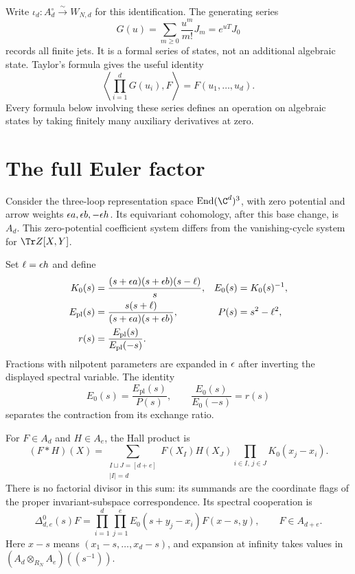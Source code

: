 Write $\iota_d:A_d^\circ\xrightarrow{\sim}W_{N,d}$ for this
identification. The generating series
\begin{equation}\label{cyjets:eq:generating-state}
 G(u)=\sum_{m\geq0}\frac{u^m}{m!}J_m=e^{uT}J_0
\end{equation}
records all finite jets. It is a formal series of states, not an
additional algebraic state. Taylor's formula gives the useful identity
\begin{equation}\label{cyjets:eq:taylor-pairing}
 \left\langle\prod_{i=1}^dG(u_i),F\right\rangle=F(u_1,\ldots,u_d).
\end{equation}
Every formula below involving these series defines an operation on
algebraic states by taking finitely many auxiliary derivatives at zero.

\section{The full Euler factor}
\label{cyjets:sec:euler}

Consider the three-loop representation space
$\operatorname{End}(\C^d)^3$, with zero potential and arrow weights
$\epsilon a,\epsilon b,-\epsilon h$. Its equivariant cohomology, after this
base change, is $A_d$. This zero-potential coefficient system differs
from the vanishing-cycle system for $\Tr Z[X,Y]$.

Set $\ell=\epsilon h$ and define
\begin{equation}\label{cyjets:eq:kernels}
 \begin{aligned}
 K_0(s)&=\frac{(s+\epsilon a)(s+\epsilon b)(s-\ell)}s,
 &E_0(s)&=K_0(s)^{-1},\\
 E_{\mathrm{pl}}(s)&=\frac{s(s+\ell)}{(s+\epsilon a)(s+\epsilon b)},
 &P(s)&=s^2-\ell^2,\\
 r(s)&=\frac{E_{\mathrm{pl}}(s)}{E_{\mathrm{pl}}(-s)}.
 \end{aligned}
\end{equation}
Fractions with nilpotent parameters are expanded in $\epsilon$ after
inverting the displayed spectral variable. The identity
\begin{equation}\label{cyjets:eq:even-factor}
 E_0(s)=\frac{E_{\mathrm{pl}}(s)}{P(s)},\qquad
 \frac{E_0(s)}{E_0(-s)}=r(s)
\end{equation}
separates the contraction from its exchange ratio.

For $F\in A_d$ and $H\in A_e$, the Hall product is
\begin{equation}\label{cyjets:eq:hall-product}
 (F*H)(X)=
 \sum_{\substack{I\sqcup J=[d+e]\\|I|=d}}
 F(X_I)H(X_J)\prod_{i\in I,\,j\in J}K_0(x_j-x_i).
\end{equation}
There is no factorial divisor in this sum: its summands are the
coordinate flags of the proper invariant-subspace correspondence.
Its spectral cooperation is
\begin{equation}\label{cyjets:eq:hall-split}
 \Delta^0_{d,e}(s)F
 =\prod_{i=1}^d\prod_{j=1}^eE_0(s+y_j-x_i)F(x-s,y),
 \qquad F\in A_{d+e}.
\end{equation}
Here $x-s$ means $(x_1-s,\ldots,x_d-s)$, and expansion at infinity
takes values in $(A_d\otimes_{R_N}A_e)((s^{-1}))$.

